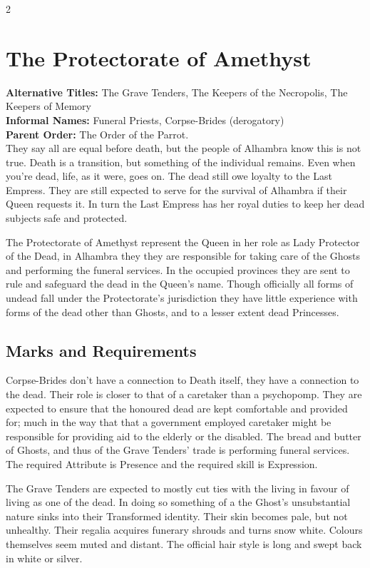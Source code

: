 \begin{multicols}{2}
\section*{The Protectorate of Amethyst }
\label{sec:Amethyst}

\noindent \textbf{Alternative Titles:} The Grave Tenders, The Keepers of the Necropolis, The Keepers of Memory\\

\noindent \textbf{Informal Names:} Funeral Priests, Corpse-Brides (derogatory)\\

\noindent \textbf{Parent Order:} The Order of the Parrot. \\

\noindent They say all are equal before death, but the people of Alhambra know this is not true. Death is a transition, but something of the individual remains. Even when you're dead, life, as it were, goes on. The dead still owe loyalty to the Last Empress. They are still expected to serve for the survival of Alhambra if their Queen requests it. In turn the Last Empress has her royal duties to keep her dead subjects safe and protected.

The Protectorate of Amethyst represent the Queen in her role as Lady Protector of the Dead, in Alhambra they they are responsible for taking care of the Ghosts and performing the funeral services. In the occupied provinces they are sent to rule and safeguard the dead in the Queen's name. Though officially all forms of undead fall under the Protectorate's jurisdiction they have little experience with forms of the dead other than Ghosts, and to a lesser extent dead Princesses. 

\subsection*{Marks and Requirements}
Corpse-Brides don't have a connection to Death itself, they have a connection to the dead. Their role is closer to that of a caretaker than a psychopomp. They are expected to ensure that the honoured dead are kept comfortable and provided for; much in the way that that a government employed caretaker might be responsible for providing aid to the elderly or the disabled. The bread and butter of Ghosts, and thus of the Grave Tenders' trade is performing funeral services. The required Attribute is Presence and the required skill is Expression.

The Grave Tenders are expected to mostly cut ties with the living in favour of living as one of the dead. In doing so something of a the Ghost's unsubstantial nature sinks into their Transformed identity. Their skin becomes pale, but not unhealthy. Their regalia acquires funerary shrouds and turns snow white. Colours themselves seem muted and distant. The official hair style is long and swept back in white or silver. 



\end{multicols}
